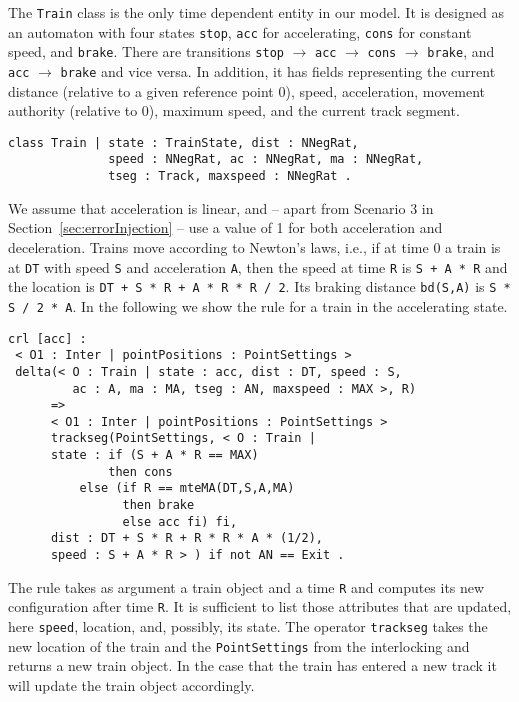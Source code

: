 The \verb|Train| class is the only time dependent entity in our
model. It is designed as an automaton with four
states \verb|stop|, \verb|acc| for accelerating, \verb|cons| for
constant speed, and \verb|brake|. There are transitions \verb|stop|
$\to $ \verb|acc| $\to $ \verb|cons| $\to $ \verb|brake|,
and \verb|acc| $\to$ \verb|brake| and vice versa. In addition, it has
fields representing the current distance (relative to a given
reference point 0), speed, acceleration, movement authority (relative
to 0), maximum speed, and the current track segment.
\begin{lstlisting}
class Train | state : TrainState, dist : NNegRat,
              speed : NNegRat, ac : NNegRat, ma : NNegRat,
              tseg : Track, maxspeed : NNegRat .
\end{lstlisting}
We assume that acceleration is linear, and -- apart from Scenario 3 in Section~\ref{sec:errorInjection} -- use a value of 1 for both acceleration and deceleration. Trains move according to Newton's laws, i.e., if at time $0$ a train is at \verb|DT| with speed \verb|S| and acceleration \verb|A|, then the speed at time \verb|R| is \verb|S + A * R| and the location is \verb|DT + S * R + A * R * R / 2|. Its braking distance \verb|bd(S,A)| is \verb|S * S / 2 * A|. In the following we show the rule for a train in the accelerating state.

\begin{lstlisting}
crl [acc] :
 < O1 : Inter | pointPositions : PointSettings >
 delta(< O : Train | state : acc, dist : DT, speed : S,
         ac : A, ma : MA, tseg : AN, maxspeed : MAX >, R)
      =>
      < O1 : Inter | pointPositions : PointSettings >
      trackseg(PointSettings, < O : Train |  
      state : if (S + A * R == MAX)     
              then cons
	      else (if R == mteMA(DT,S,A,MA)
	            then brake
	            else acc fi) fi, 
      dist : DT + S * R + R * R * A * (1/2),
      speed : S + A * R > ) if not AN == Exit .
\end{lstlisting}
The rule takes as argument a train object and a time \texttt{R} and computes its new configuration after time \texttt{R}. It is sufficient to list those attributes that are updated, here \texttt{speed}, location, and, possibly, its state.
The operator \verb|trackseg|  takes the new
location of the train and the \verb|PointSettings| from the
interlocking and returns a new train object.
In the case that the train has entered a new track it will
update the train object accordingly.

